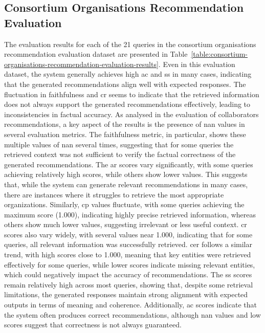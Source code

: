\subsection*{Consortium Organisations Recommendation Evaluation}\label{subsec:consortium-organisations-recommendation-evaluation}
The evaluation results for each of the 21 queries in the consortium organisations recommendation evaluation dataset are presented in Table~\ref{table:consortium-organisations-recommendation-evaluation-results}.
Even in this evaluation dataset, the system generally achieves high \gls{ac} and \gls{ss} in many cases, indicating that the generated recommendations align well with expected responses.
The fluctuation in faithfulness and \gls{cr} seems to indicate that the retrieved information does not always support the generated recommendations effectively, leading to inconsistencies in factual accuracy.
As analysed in the evaluation of collaborators recommendations, a key aspect of the results is the presence of \gls{nan} values in several evaluation metrics.
The faithfulness metric, in particular, shows these multiple values of \gls{nan} several times, suggesting that for some queries the retrieved context was not sufficient to verify the factual correctness of the generated recommendations.
The \gls{ar} scores vary significantly, with some queries achieving relatively high scores, while others show lower values.
This suggests that, while the system can generate relevant recommendations in many cases, there are instances where it struggles to retrieve the most appropriate organizations.
Similarly, \gls{cp} values fluctuate, with some queries achieving the maximum score (1.000), indicating highly precise retrieved information, whereas others show much lower values, suggesting irrelevant or less useful context.
\gls{cr} scores also vary widely, with several values near 1.000, indicating that for some queries, all relevant information was successfully retrieved.
\gls{cer} follows a similar trend, with high scores close to 1.000, meaning that key entities were retrieved effectively for some queries, while lower scores indicate missing relevant entities, which could negatively impact the accuracy of recommendations.
The \gls{ss} scores remain relatively high across most queries, showing that, despite some retrieval limitations, the generated responses maintain strong alignment with expected outputs in terms of meaning and coherence.
Additionally, \gls{ac} scores indicate that the system often produces correct recommendations, although \gls{nan} values and low scores suggest that correctness is not always guaranteed.

